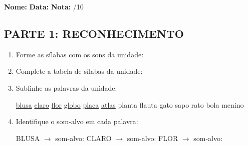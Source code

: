 \begin{exercicio}

\noindent\textbf{Nome:} \underline{\hspace{3.2cm}} \quad \textbf{Data:} \underline{\hspace{1.6cm}} \quad \textbf{Nota:} \underline{\hspace{0.9cm}}/10


\subsection*{PARTE 1: RECONHECIMENTO}

\begin{enumerate}

  \item Forme as sílabas com os sons da unidade:

\begin{center}
\end{center}

  \item Complete a tabela de sílabas da unidade:

\begin{center}
\end{center}

  \item Sublinhe as palavras da unidade:

\begin{center}
  \uline{blusa} \quad \uline{claro} \quad \uline{flor} \quad \uline{globo} \quad \uline{placa} \quad \uline{atlas} \quad planta \quad flauta \quad gato \quad sapo \quad rato \quad bola \quad menino
\end{center}

  \item Identifique o som-alvo em cada palavra:
  \begin{center}
  BLUSA $\rightarrow$ som-alvo: \underline{\hspace{1cm}} \quad CLARO $\rightarrow$ som-alvo: \underline{\hspace{1cm}} \quad FLOR $\rightarrow$ som-alvo: \underline{\hspace{1cm}}
  \end{center}


\end{enumerate}
\end{exercicio}
